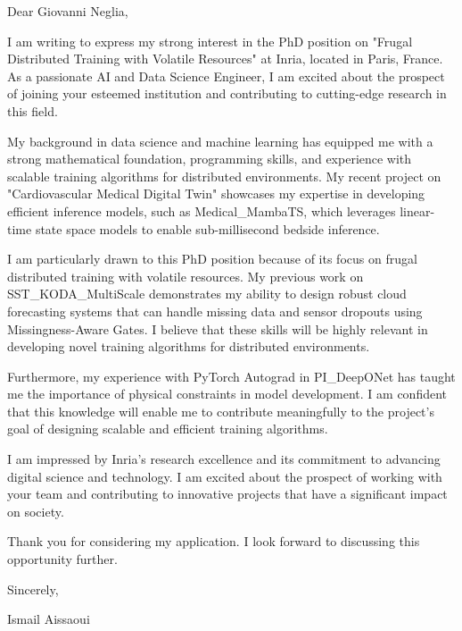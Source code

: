 \documentclass{letter}
\begin{document}
\opening{}

Dear Giovanni Neglia,

I am writing to express my strong interest in the PhD position on "Frugal Distributed Training with Volatile Resources" at Inria, located in Paris, France. As a passionate AI and Data Science Engineer, I am excited about the prospect of joining your esteemed institution and contributing to cutting-edge research in this field.

My background in data science and machine learning has equipped me with a strong mathematical foundation, programming skills, and experience with scalable training algorithms for distributed environments. My recent project on "Cardiovascular Medical Digital Twin" showcases my expertise in developing efficient inference models, such as Medical_MambaTS, which leverages linear-time state space models to enable sub-millisecond bedside inference.

I am particularly drawn to this PhD position because of its focus on frugal distributed training with volatile resources. My previous work on SST_KODA_MultiScale demonstrates my ability to design robust cloud forecasting systems that can handle missing data and sensor dropouts using Missingness-Aware Gates. I believe that these skills will be highly relevant in developing novel training algorithms for distributed environments.

Furthermore, my experience with PyTorch Autograd in PI_DeepONet has taught me the importance of physical constraints in model development. I am confident that this knowledge will enable me to contribute meaningfully to the project's goal of designing scalable and efficient training algorithms.

I am impressed by Inria's research excellence and its commitment to advancing digital science and technology. I am excited about the prospect of working with your team and contributing to innovative projects that have a significant impact on society.

Thank you for considering my application. I look forward to discussing this opportunity further.

Sincerely,

Ismail Aissaoui

\closing{}
\end{document}
